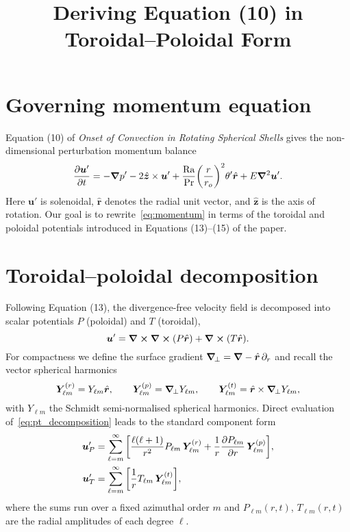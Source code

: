 \documentclass[11pt]{article}
\title{Deriving Equation (10) in Toroidal--Poloidal Form}
\author{}
\date{}
\numberwithin{equation}{section}
\begin{document}
\maketitle

\section{Governing momentum equation}
Equation (10) of \emph{Onset of Convection in Rotating Spherical Shells} gives the non-dimensional perturbation momentum balance
\begin{equation}
  \pdv{\bm{u}'}{t} = - \grad p' - 2 \hat{\bm{z}} \times \bm{u}'
  + \frac{\mathrm{Ra}}{\mathrm{Pr}} \qty(\frac{r}{r_o})^2 \theta' \hat{\bm{r}}
  + E \grad^2 \bm{u}' .
  \label{eq:momentum}
\end{equation}
Here $\bm{u}'$ is solenoidal, $\hat{\bm{r}}$ denotes the radial unit vector, and $\hat{\bm{z}}$ is the axis of rotation. Our goal is to rewrite~\eqref{eq:momentum} in terms of the toroidal and poloidal potentials introduced in Equations (13)--(15) of the paper.

\section{Toroidal--poloidal decomposition}
Following Equation (13), the divergence-free velocity field is decomposed into scalar potentials $P$ (poloidal) and $T$ (toroidal),
\begin{equation}
  \bm{u}' = \curl \curl \qty(P \hat{\bm{r}}) + \curl \qty(T \hat{\bm{r}}).
  \label{eq:pt_decomposition}
\end{equation}
For compactness we define the surface gradient $\grad_{\!\perp} = \grad - \hat{\bm{r}} \,\partial_r$ and recall the vector spherical harmonics
\begin{equation}
  \bm{Y}_{\ell m}^{(r)} = Y_{\ell m} \hat{\bm{r}}, \qquad
  \bm{Y}_{\ell m}^{(p)} = \grad_{\!\perp} Y_{\ell m}, \qquad
  \bm{Y}_{\ell m}^{(t)} = \hat{\bm{r}} \times \grad_{\!\perp} Y_{\ell m},
\end{equation}
with $Y_{\ell m}$ the Schmidt semi-normalised spherical harmonics. Direct evaluation of~\eqref{eq:pt_decomposition} leads to the standard component form
\begin{align}
  \bm{u}_P' &= \sum_{\ell=m}^{\infty} \qty[
     \frac{\ell (\ell+1)}{r^2} P_{\ell m} \, \bm{Y}_{\ell m}^{(r)}
     + \frac{1}{r} \pdv{P_{\ell m}}{r} \, \bm{Y}_{\ell m}^{(p)}
  ], \label{eq:poloidal_components} \\
  \bm{u}_T' &= \sum_{\ell=m}^{\infty} \qty[
     \frac{1}{r} T_{\ell m} \, \bm{Y}_{\ell m}^{(t)}
  ], \label{eq:toroidal_components}
\end{align}
where the sums run over a fixed azimuthal order $m$ and $P_{\ell m}(r,t)$, $T_{\ell m}(r,t)$ are the radial amplitudes of each degree $\ell$.
\end{document}
